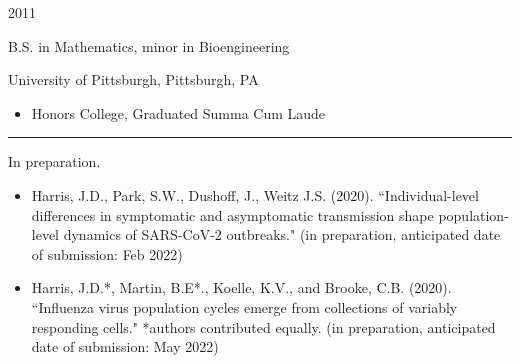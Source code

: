 \documentclass[a4paper,10pt]{article}
\newlength{\cvcolumngapwidth}
\newlength{\cvleftcolumnwidth}
\newlength{\cvrightcolumnwidth}
\newcommand{\cvsectionstyle}[1]{{\normalsize\cvsectionfont\textcolor{cvsectioncolor}{#1}}}
\newcommand{\cvtitlestyle}[1]{{\large\cvtitlefont\textcolor{cvtitlecolor}{#1}}}
\newcommand{\cvdurationstyle}[1]{{\small\cvdurationfont\textcolor{cvdurationcolor}{#1}}}
\newlength{\cvafteritemskipamount}
\newlength{\cvaftersectionskipamount}
\newlength{\cvbetweensectionandheadingextraskipamount}
\newlength{\cvaftertitleskipamount}
\newlength{\cvparskip}
\newcommand{\cvsection}[1]{
            \begin{minipage}[t]{\cvleftcolumnwidth}
                \raggedleft\cvsectionstyle{#1}
            \end{minipage}%
            \hspace{\cvcolumngapwidth}%
            \begin{minipage}[t]{\cvrightcolumnwidth}
                \textcolor{cvrulecolor}{\rule{\cvrightcolumnwidth}{0.3mm}}
            \end{minipage}
        
            \vspace{\cvaftersectionskipamount}
        }
\newcommand{\cvitem}[2]{
            \begin{minipage}[t]{\cvleftcolumnwidth}
                \raggedleft #1
            \end{minipage}%
            \hspace{\cvcolumngapwidth}%
            \begin{minipage}[t]{\cvrightcolumnwidth}
                \setlength{\parskip}{\cvparskip} #2
            \end{minipage}
        
            \vspace{\cvafteritemskipamount}
        }
\newcommand{\cvtitle}[1]{
            \cvtitlestyle{#1}
        
            \vspace{\cvaftertitleskipamount}
            \vspace{-\cvparskip}
        }
\begin{document}
        \cvitem{
            \cvdurationstyle{2011}
        }{
            \cvtitle{B.S. in Mathematics, minor in Bioengineering}
        	University of Pittsburgh, Pittsburgh, PA
            \begin{itemize}[leftmargin=*]
                \item  Honors College, Graduated Summa Cum Laude
            \end{itemize}
        }
        
        \cvsection{PUBLICATIONS}
        
        \cvitem{
            \cvdurationstyle{In preparation.}
        }{
            \begin{itemize}[leftmargin=*]
            	\item Harris, J.D., Park, S.W., Dushoff, J., Weitz J.S. (2020). ``Individual-level differences in symptomatic and asymptomatic transmission shape population-level dynamics of SARS-CoV-2 outbreaks." (in preparation, anticipated date of submission: Feb 2022)
        	\item Harris, J.D.*, Martin, B.E*., Koelle, K.V., and Brooke, C.B. (2020). ``Influenza virus population cycles emerge from collections of variably responding cells." *authors contributed equally. (in preparation, anticipated date of submission: May 2022)
            \end{itemize}
        }
        
\end{document}
